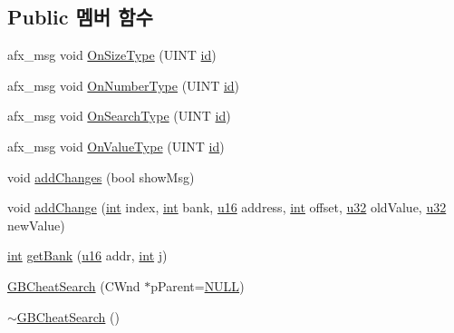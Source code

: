 \subsection*{Public 멤버 함수}
\begin{DoxyCompactItemize}
\item 
afx\+\_\+msg void \mbox{\hyperlink{class_g_b_cheat_search_afd12bb730e61ef2cf06ccd22e89eb487}{On\+Size\+Type}} (U\+I\+NT \mbox{\hyperlink{_commands_8cpp_a7b7a6396b2c82ad46c6d8b2bf141a8dd}{id}})
\item 
afx\+\_\+msg void \mbox{\hyperlink{class_g_b_cheat_search_a2efda7e683705801f7c40be0ae7e59f2}{On\+Number\+Type}} (U\+I\+NT \mbox{\hyperlink{_commands_8cpp_a7b7a6396b2c82ad46c6d8b2bf141a8dd}{id}})
\item 
afx\+\_\+msg void \mbox{\hyperlink{class_g_b_cheat_search_a676c75efb01f9db07ca3d4bc6f499687}{On\+Search\+Type}} (U\+I\+NT \mbox{\hyperlink{_commands_8cpp_a7b7a6396b2c82ad46c6d8b2bf141a8dd}{id}})
\item 
afx\+\_\+msg void \mbox{\hyperlink{class_g_b_cheat_search_a9f187d1fa0dfccbaa4a7a298284a2b8f}{On\+Value\+Type}} (U\+I\+NT \mbox{\hyperlink{_commands_8cpp_a7b7a6396b2c82ad46c6d8b2bf141a8dd}{id}})
\item 
void \mbox{\hyperlink{class_g_b_cheat_search_a10b0314fc3b27cda2e217539c9c1e052}{add\+Changes}} (bool show\+Msg)
\item 
void \mbox{\hyperlink{class_g_b_cheat_search_a1765135b0200e93b3d8fd13c8c9c2ea0}{add\+Change}} (\mbox{\hyperlink{_util_8cpp_a0ef32aa8672df19503a49fab2d0c8071}{int}} index, \mbox{\hyperlink{_util_8cpp_a0ef32aa8672df19503a49fab2d0c8071}{int}} bank, \mbox{\hyperlink{_system_8h_a9e6c91d77e24643b888dbd1a1a590054}{u16}} address, \mbox{\hyperlink{_util_8cpp_a0ef32aa8672df19503a49fab2d0c8071}{int}} offset, \mbox{\hyperlink{_system_8h_a10e94b422ef0c20dcdec20d31a1f5049}{u32}} old\+Value, \mbox{\hyperlink{_system_8h_a10e94b422ef0c20dcdec20d31a1f5049}{u32}} new\+Value)
\item 
\mbox{\hyperlink{_util_8cpp_a0ef32aa8672df19503a49fab2d0c8071}{int}} \mbox{\hyperlink{class_g_b_cheat_search_aa5ca7951ce9dcc691eff7abb51cde184}{get\+Bank}} (\mbox{\hyperlink{_system_8h_a9e6c91d77e24643b888dbd1a1a590054}{u16}} addr, \mbox{\hyperlink{_util_8cpp_a0ef32aa8672df19503a49fab2d0c8071}{int}} j)
\item 
\mbox{\hyperlink{class_g_b_cheat_search_ad5e4e36c0e6c0155db2b2e1887419d3e}{G\+B\+Cheat\+Search}} (C\+Wnd $\ast$p\+Parent=\mbox{\hyperlink{_system_8h_a070d2ce7b6bb7e5c05602aa8c308d0c4}{N\+U\+LL}})
\item 
\mbox{\hyperlink{class_g_b_cheat_search_add90a762d632511054e57962eac4cbbb}{$\sim$\+G\+B\+Cheat\+Search}} ()
\end{DoxyCompactItemize}
